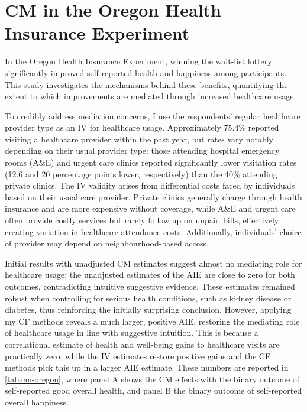 \section{CM in the Oregon Health Insurance Experiment}
\label{sec:oregon}
In the Oregon Health Insurance Experiment, winning the wait-list lottery significantly improved self-reported health and happiness among participants. 
This study investigates the mechanisms behind these benefits, quantifying the extent to which improvements are mediated through increased healthcare usage.

To credibly address mediation concerns, I use the respondents' regular healthcare provider type as an IV for healthcare usage.
Approximately 75.4\% reported visiting a healthcare provider within the past year, but rates vary notably depending on their usual provider type: those attending hospital emergency rooms (A\&E) and urgent care clinics reported significantly lower visitation rates (12.6 and 20 percentage points lower, respectively) than the 40\% attending private clinics.
The IV validity arises from differential costs faced by individuals based on their usual care provider.
Private clinics generally charge through health insurance and are more expensive without coverage, while A\&E and urgent care often provide costly services but rarely follow up on unpaid bills, effectively creating variation in healthcare attendance costs.
Additionally, individuals' choice of provider may depend on neighbourhood-based access.

Initial results with unadjusted CM estimates suggest almost no mediating role for healthcare usage; the unadjusted estimates of the AIE are close to zero for both outcomes, contradicting intuitive suggestive evidence.
These estimates remained robust when controlling for serious health conditions, such as kidney disease or diabetes, thus reinforcing the initially surprising conclusion.
However, applying my CF methods reveals a much larger, positive AIE, restoring the mediating role of healthcare usage in line with suggestive intuition.
This is because a correlational estimate of health and well-being gains to healthcare visits are practically zero, while the IV estimates restore positive gains and the CF methods pick this up in a larger AIE estimate.
These numbers are reported in \autoref{tab:cm-oregon}, where panel A shows the CM effects with the binary outcome of self-reported good overall health, and panel B the binary outcome of self-reported overall happiness.

